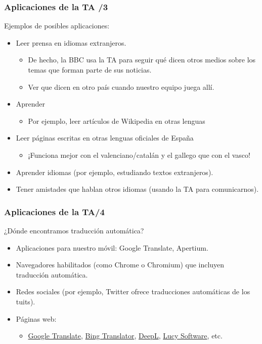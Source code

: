 \documentclass{beamer}
\begin{document}
\begin{frame}
\frametitle{Aplicaciones de la TA /3}
Ejemplos de posibles aplicaciones:
\begin{itemize}
\item Leer prensa en idiomas extranjeros.
\begin{itemize}
\item De hecho, la BBC usa la TA para seguir qué dicen otros medios sobre los temas que forman parte de sus noticias.
\item Ver que dicen en otro país cuando nuestro equipo juega allí.
\end{itemize}
\item Aprender
\begin{itemize}
\item Por ejemplo, leer artículos de Wikipedia en otras lenguas
\end{itemize}
\item Leer páginas escritas en otras lenguas oficiales de España
\begin{itemize}
\item ¡Funciona mejor con el valenciano/catalán y el gallego que con el vasco!
\end{itemize}
\item Aprender idiomas (por ejemplo, estudiando textos extranjeros).
\item Tener amistades que hablan otros idiomas (usando la TA para comunicarnos).
\end{itemize}

\end{frame}

\begin{frame}
\frametitle{Aplicaciones de la TA/4}
¿Dónde encontramos traducción automática?
\begin{itemize}
\item Aplicaciones para nuestro móvil: Google Translate, Apertium.
\item Navegadores habilitados (como Chrome o Chromium) que incluyen traducción automática.
\item Redes sociales (por ejemplo, Twitter ofrece traducciones automáticas de los tuits).
\item Páginas web:
\begin{itemize}
\item \url{Google Translate}, \url{Bing Translator}, \url{DeepL}, \url{Lucy Software}, etc.
\end{itemize}
\end{itemize}
\end{frame}
\end{document}
